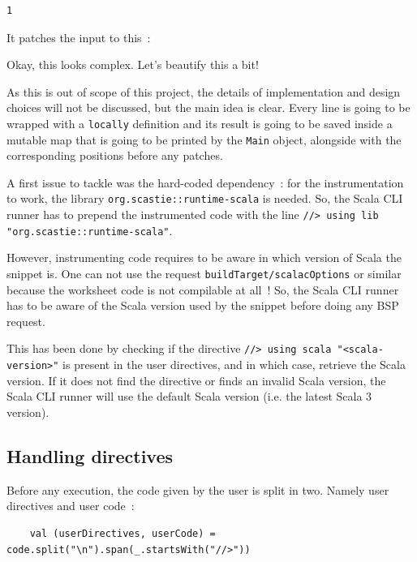 \documentclass{article}
\begin{document}
\begin{lstlisting}
1
\end{lstlisting}

It patches the input to this~:



Okay, this looks complex. Let's beautify this a bit!



As this is out of scope of this project, the details of implementation and design choices will not be discussed, but the main idea is clear. Every line is going to be wrapped with a \lstinline{locally} definition and its result is going to be saved inside a mutable map that is going to be printed by the \lstinline{Main} object, alongside with the corresponding positions before any patches.

A first issue to tackle was the hard-coded dependency~: for the instrumentation to work, the library \lstinline{org.scastie::runtime-scala} is needed. So, the Scala CLI runner has to prepend the instrumented code with the line \lstinline{//> using lib "org.scastie::runtime-scala"}.

However, instrumenting code requires to be aware in which version of Scala the snippet is. One can not use the request \lstinline{buildTarget/scalacOptions} or similar because the worksheet code is not compilable at all~! So, the Scala CLI runner has to be aware of the Scala version used by the snippet before doing any BSP request.

This has been done by checking if the directive \lstinline{//> using scala "<scala-version>"} is present in the user directives, and in which case, retrieve the Scala version. If it does not find the directive or finds an invalid Scala version, the Scala CLI runner will use the default Scala version (i.e. the latest Scala 3 version).


\subsection{Handling directives}

Before any execution, the code given by the user is split in two. Namely user directives and user code~:

\begin{lstlisting}
    val (userDirectives, userCode) = code.split("\n").span(_.startsWith("//>"))
\end{lstlisting}
\end{document}
